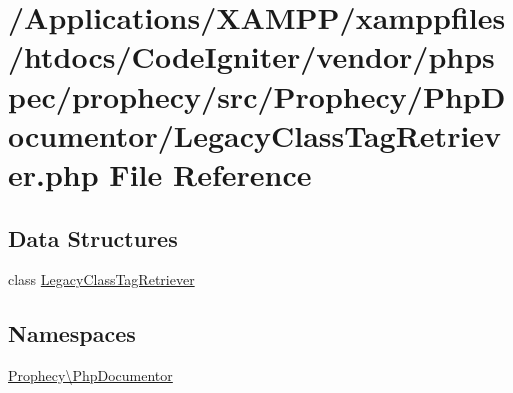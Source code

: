 \hypertarget{_legacy_class_tag_retriever_8php}{}\section{/\+Applications/\+X\+A\+M\+P\+P/xamppfiles/htdocs/\+Code\+Igniter/vendor/phpspec/prophecy/src/\+Prophecy/\+Php\+Documentor/\+Legacy\+Class\+Tag\+Retriever.php File Reference}
\label{_legacy_class_tag_retriever_8php}
\subsection*{Data Structures}
\begin{DoxyCompactItemize}
\item 
class \mbox{\hyperlink{class_prophecy_1_1_php_documentor_1_1_legacy_class_tag_retriever}{Legacy\+Class\+Tag\+Retriever}}
\end{DoxyCompactItemize}
\subsection*{Namespaces}
\begin{DoxyCompactItemize}
\item 
 \mbox{\hyperlink{namespace_prophecy_1_1_php_documentor}{Prophecy\textbackslash{}\+Php\+Documentor}}
\end{DoxyCompactItemize}
